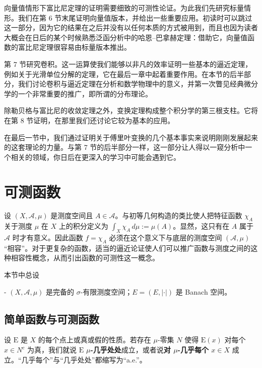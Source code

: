 向量值情形下富比尼定理的证明需要细致的可测性论证。为此我们先研究标量情形。我们在第 6 节末尾证明向量值版本，并给出一些重要应用。初读时可以跳过这一部分，因为它的结果在之后并没有以任何本质的方式被用到，而且也因为读者大概会在日后的某个时候熟悉泛函分析中的哈恩–巴拿赫定理：借助它，向量值函数的富比尼定理很容易由标量版本推出。

第 7 节研究卷积。这一运算使我们能够以非凡的效率证明一些基本的逼近定理，例如关于光滑单位分解的定理，它在最后一章中起着重要作用。在本节的后半部分，我们讨论卷积与逼近定理在分析和数学物理中的意义，并第一次瞥见经典微分学的一个非常重要的推广，即所谓的分布理论。

除勒贝格与富比尼的收敛定理之外，变换定理构成整个积分学的第三根支柱。它将在第 8 节证明，在那里我们还讨论它较为基本的应用。

在最后一节中，我们通过证明关于傅里叶变换的几个基本事实来说明刚刚发展起来的这套理论的力量。与第 7 节的后半部分一样，这一部分让人得以一窥分析中一个相关的领域，你日后在更深入的学习中可能会遇到它。

\section{可测函数}

设 $ (X,\mathcal{A},\mu) $ 是测度空间且 $ A \in \mathcal{A} $。与初等几何构造的类比使人把特征函数 $ \chi_A $ 关于测度 $ \mu $ 在 $ X $ 上的积分定义为 $ \int_X \chi_A \, d\mu := \mu(A) $。显然，这只有在 $ A $ 属于 $ \mathcal{A} $ 时才有意义。因此函数 $ f = \chi_A $ 必须在这个意义下与底层的测度空间 $ (\mathcal{A},\mu) $“相容”。对于更复杂的函数，适当的逼近论证使人们可以推广函数与测度之间的这种相容性概念，从而引出函数的可测性这一概念。

本节中总设

- $ (X,\mathcal{A},\mu) $ 是完备的 $ \sigma $-有限测度空间；$ E = (E,|\cdot|) $ 是 Banach 空间。

\subsection*{简单函数与可测函数}

设 $ \mathrm{E} $ 是 $ X $ 的每个点上或真或假的性质。若存在 $ \mu $-零集 $ N $ 使得 $ \mathrm{E}(x) $ 对每个 $ x \in N^c $ 为真，我们就说 $ \mathrm{E} $ \textbf{$ \mu $-几乎处处}成立，或者说\textbf{对 $ \mu $-几乎每个 $ x \in X $} 成立。“几乎每个”与“几乎处处”都缩写为“a.e.”。

